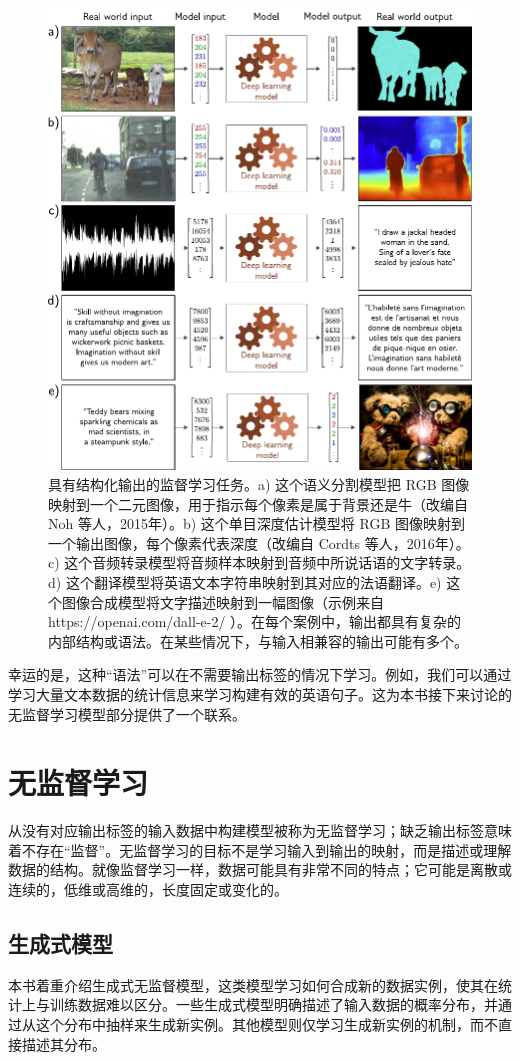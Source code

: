 \documentclass[lang=cn,newtx,10pt,scheme=chinese]{elegantbook}
\begin{document}
\begin{figure}
	\centering
	\includegraphics[width=0.7\linewidth]{PDFFigures/UDLChap1PDF/IntroModels2a_compressed.pdf}
	\caption{具有结构化输出的监督学习任务。a) 这个语义分割模型把 RGB 图像映射到一个二元图像，用于指示每个像素是属于背景还是牛（改编自 Noh 等人，2015年）。b) 这个单目深度估计模型将 RGB 图像映射到一个输出图像，每个像素代表深度（改编自 Cordts 等人，2016年）。c) 这个音频转录模型将音频样本映射到音频中所说话语的文字转录。d) 这个翻译模型将英语文本字符串映射到其对应的法语翻译。e) 这个图像合成模型将文字描述映射到一幅图像（示例来自 https://openai.com/dall-e-2/ ）。在每个案例中，输出都具有复杂的内部结构或语法。在某些情况下，与输入相兼容的输出可能有多个。}
\end{figure}


幸运的是，这种“语法”可以在不需要输出标签的情况下学习。例如，我们可以通过学习大量文本数据的统计信息来学习构建有效的英语句子。这为本书接下来讨论的无监督学习模型部分提供了一个联系。

\section{无监督学习}
从没有对应输出标签的输入数据中构建模型被称为无监督学习；缺乏输出标签意味着不存在“监督”。无监督学习的目标不是学习输入到输出的映射，而是描述或理解数据的结构。就像监督学习一样，数据可能具有非常不同的特点；它可能是离散或连续的，低维或高维的，长度固定或变化的。

\subsection{生成式模型}
本书着重介绍生成式无监督模型，这类模型学习如何合成新的数据实例，使其在统计上与训练数据难以区分。一些生成式模型明确描述了输入数据的概率分布，并通过从这个分布中抽样来生成新实例。其他模型则仅学习生成新实例的机制，而不直接描述其分布。
\end{document}
